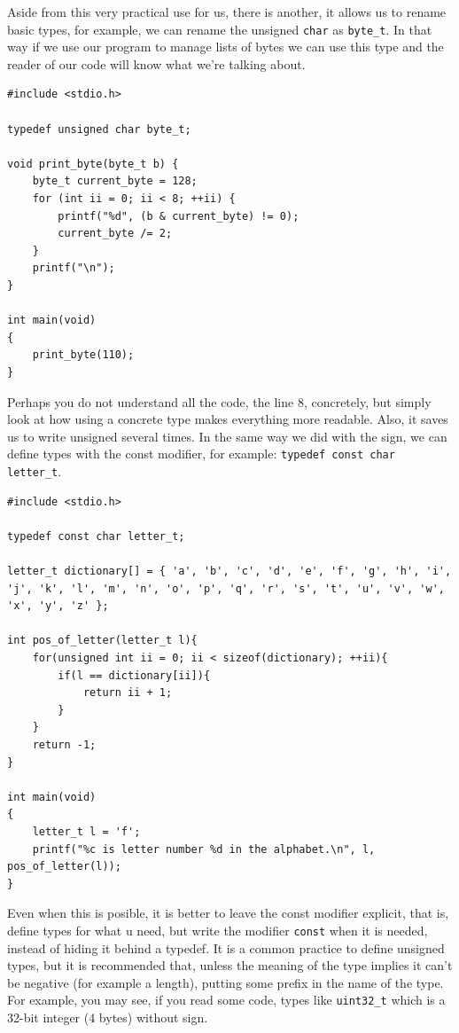 \documentclass[a4paper]{article}
\begin{document}
Aside from this very practical use for us, there is another, it allows us to
rename basic types, for example, we can rename the unsigned \verb!char! as
\verb!byte_t!. In that way if we use our program to manage lists of bytes we can
use this type and the reader of our code will know what we're talking about.

\noindent
\begin{minipage}[H]{\linewidth}
\mbox{}
\begin{lstlisting}[style=C,
caption={Redefining basic types},
label={lst:typedefBasicType}]
#include <stdio.h>

typedef unsigned char byte_t;

void print_byte(byte_t b) {
    byte_t current_byte = 128;
    for (int ii = 0; ii < 8; ++ii) {
        printf("%d", (b & current_byte) != 0);
        current_byte /= 2;
    }
    printf("\n");
}

int main(void)
{
    print_byte(110);
}
\end{lstlisting}
\end{minipage}

Perhaps you do not understand all the code, the line 8, concretely, but simply
look at how using a concrete type makes everything more readable. Also, it
saves us to write unsigned several times. In the same way we did with the sign,
we can define types with the const modifier, for example:
\verb!typedef const char letter_t!.

\noindent
\begin{minipage}[H]{\linewidth}
\mbox{}
\begin{lstlisting}[style=C,
caption={Example of definition of a type with const modifier},
label={lst:typedefConstType}]
#include <stdio.h>

typedef const char letter_t;

letter_t dictionary[] = { 'a', 'b', 'c', 'd', 'e', 'f', 'g', 'h', 'i', 'j', 'k', 'l', 'm', 'n', 'o', 'p', 'q', 'r', 's', 't', 'u', 'v', 'w', 'x', 'y', 'z' };

int pos_of_letter(letter_t l){
    for(unsigned int ii = 0; ii < sizeof(dictionary); ++ii){
        if(l == dictionary[ii]){
            return ii + 1;
        }
    }
    return -1;
}

int main(void)
{
    letter_t l = 'f';
    printf("%c is letter number %d in the alphabet.\n", l, pos_of_letter(l));
}
\end{lstlisting}
\end{minipage}

Even when this is posible, it is better to leave the const modifier explicit,
that is, define types for what u need, but write the modifier \verb!const! when
it is needed, instead of hiding it behind a typedef. It is a common practice
to define unsigned types, but it is recommended that, unless the meaning of the
type implies it can't be negative (for example a length), putting some prefix in
the name of the type. For example, you may see, if you read some code, types
like \verb!uint32_t! which is a 32-bit integer (4 bytes) without sign.
\end{document}
